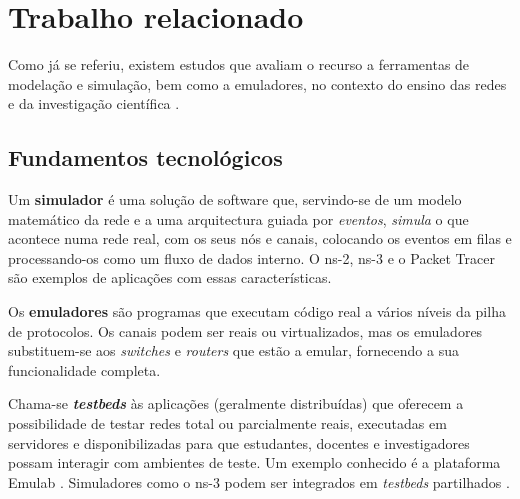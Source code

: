 \chapter{Trabalho relacionado}
\label{ch:relatedwork}

Como já se referiu, existem estudos que avaliam o recurso a ferramentas de modelação e simulação, bem como a emuladores, no contexto do ensino das redes e da investigação científica \cite{netvirtwithgns3}.

\section{Fundamentos tecnológicos}
\label{sec:techintro}



Um \textbf{simulador} é uma solução de software que, servindo-se de um modelo matemático da rede e a uma arquitectura guiada por \emph{eventos}, \emph{simula} o que acontece numa rede real, com os seus nós e canais, colocando os eventos em filas e processando-os como um fluxo de dados interno. \cite{netsimulationoremulation} O ns-2, ns-3 e o Packet Tracer são exemplos de aplicações com essas características.

Os \textbf{emuladores} são programas que executam código real a vários níveis da pilha de protocolos. Os canais podem ser reais ou virtualizados, mas os emuladores substituem-se aos \emph{switches} e \emph{routers} que estão a emular, fornecendo a sua funcionalidade completa. \cite{netsimulationoremulation}

Chama-se \textbf{\emph{testbeds}} às aplicações (geralmente distribuídas) que oferecem a possibilidade de testar redes total ou parcialmente reais, executadas em servidores e disponibilizadas para que estudantes, docentes e investigadores possam interagir com ambientes de teste. Um exemplo conhecido é a plataforma Emulab \cite{hermenier2012build}. Simuladores como o ns-3 podem ser integrados em \emph{testbeds} partilhados \cite{Henderson08networksimulations}.


